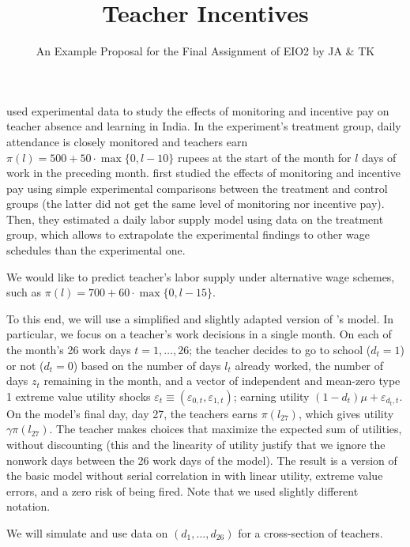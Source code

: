\documentclass[fleqn,12pt]{article}
\title{Teacher Incentives}
\author{An Example Proposal for the Final Assignment of EIO2 by JA \& TK}
\date{}
\begin{document}
\maketitle

\citet{aer12:dufloetal} used experimental data to study the effects of monitoring and incentive pay on teacher absence and learning in India. In the experiment's treatment group, daily attendance is closely monitored and teachers earn $\pi(l)=500+50\cdot\max\{0,l-10\}$ rupees at the start of the month for $l$ days of work in the preceding month. \citeauthor{aer12:dufloetal} first studied the effects of monitoring and incentive pay using simple experimental comparisons between the treatment and control groups (the latter did not get the same level of monitoring nor incentive pay). Then, they estimated a daily labor supply model using data on the treatment group, which allows to extrapolate the experimental findings to other wage schedules than the experimental one. 

We would like to predict teacher's labor supply under alternative wage schemes, such as $\pi(l)=700+60\cdot\max\{0,l-15\}$.

To this end, we will use a simplified and slightly adapted version of \citeauthor{aer12:dufloetal}'s model. In particular, we focus on a teacher's work decisions in a single month. On each of the month's 26 work days $t=1,\ldots,26$; the teacher decides to go to school ($d_t=1$) or not ($d_t=0$) based on the number of days $l_t$ already worked, the number of days $z_t$ remaining in the month, and a vector of independent and mean-zero type 1 extreme value utility shocks $\varepsilon_t\equiv(\varepsilon_{0,t},\varepsilon_{1,t})$; earning utility $(1-d_t)\mu+\varepsilon_{d_t,t}$. On the model's final day, day 27, the teachers earns $\pi(l_{27})$, which gives utility $\gamma\pi(l_{27})$.  The teacher makes choices that maximize the expected sum of utilities, without discounting (this and the linearity of utility justify that we ignore the nonwork days between the 26 work days of the model). The result is a version of the basic model without serial correlation in \citet[][Section III]{aer12:dufloetal} with linear utility, extreme value errors, and a zero risk of being fired. Note that we used slightly different notation.

We will simulate and use data on $(d_1,\ldots,d_{26})$ for a cross-section of teachers. 



\end{document}
